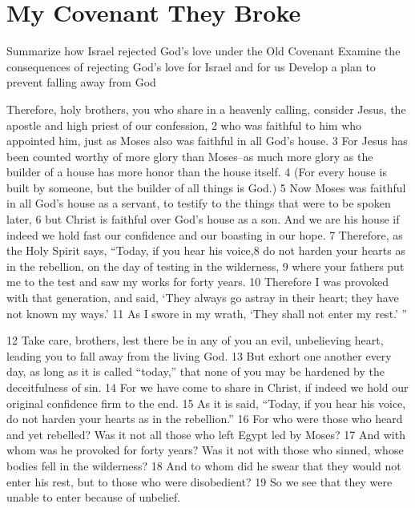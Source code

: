 \chapter{My Covenant They Broke}

\begin{goals}
\goal Summarize how Israel rejected God's love under the Old Covenant
\goal Examine the consequences of rejecting God's love for Israel and for us
\goal Develop a plan to prevent falling away from God
\end{goals}

\begin{bible}


Therefore, holy brothers, you who share in a heavenly calling, consider Jesus, the apostle and high priest of our confession, 2 who was faithful to him who appointed him, just as Moses also was faithful in all God's house. 3 For Jesus has been counted worthy of more glory than Moses--as much more glory as the builder of a house has more honor than the house itself. 4 (For every house is built by someone, but the builder of all things is God.) 5 Now Moses was faithful in all God's house as a servant, to testify to the things that were to be spoken later, 6 but Christ is faithful over God's house as a son. And we are his house if indeed we hold fast our confidence and our boasting in our hope. 7 Therefore, as the Holy Spirit says, ``Today, if you hear his voice,8 do not harden your hearts as in the rebellion, on the day of testing in the wilderness, 9 where your fathers put me to the test and saw my works for forty years. 10 Therefore I was provoked with that generation, and said, `They always go astray in their heart; they have not known my ways.' 11 As I swore in my wrath, `They shall not enter my rest.' ''

12 Take care, brothers, lest there be in any of you an evil, unbelieving heart, leading you to fall away from the living God. 13 But exhort one another every day, as long as it is called ``today,'' that none of you may be hardened by the deceitfulness of sin. 14 For we have come to share in Christ, if indeed we hold our original confidence firm to the end. 15 As it is said, ``Today, if you hear his voice, do not harden your hearts as in the rebellion.'' 16 For who were those who heard and yet rebelled? Was it not all those who left Egypt led by Moses? 17 And with whom was he provoked for forty years? Was it not with those who sinned, whose bodies fell in the wilderness? 18 And to whom did he swear that they would not enter his rest, but to those who were disobedient? 19 So we see that they were unable to enter because of unbelief. 


\end{bible}
